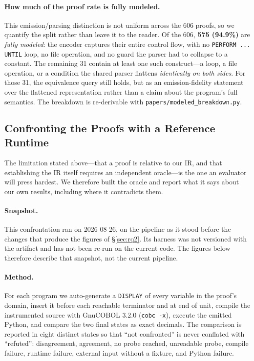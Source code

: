 \documentclass[sigconf,nonacm]{acmart}
\begin{document}
\paragraph{How much of the proof rate is fully modeled.} This emission/parsing distinction is not uniform across the 606 proofs, so we quantify the split rather than leave it to the reader. Of the 606, \textbf{575 (94.9\%)} are \emph{fully modeled}: the encoder captures their entire control flow, with no \texttt{PERFORM ... UNTIL} loop, no file operation, and no guard the parser had to collapse to a constant. The remaining 31 contain at least one such construct---a loop, a file operation, or a condition the shared parser flattens \emph{identically on both sides}. For those 31, the equivalence query still holds, but as an emission-fidelity statement over the flattened representation rather than a claim about the program's full semantics. The breakdown is re-derivable with \texttt{papers/modeled\_breakdown.py}.

\subsection{Confronting the Proofs with a Reference Runtime}\label{sec:oracle}

The limitation stated above---that a proof is relative to our IR, and that establishing the IR itself requires an independent oracle---is the one an evaluator will press hardest. We therefore built the oracle and report what it says about our own results, including where it contradicts them.

\paragraph{Snapshot.} This confrontation ran on 2026-08-26, on the pipeline as it stood before the changes that produce the figures of \S\ref{sec:rq2}. Its harness was not versioned with the artifact and has not been re-run on the current code. The figures below therefore describe that snapshot, not the current pipeline.

\paragraph{Method.} For each program we auto-generate a \texttt{DISPLAY} of every variable in the proof's domain, insert it before each reachable terminator and at end of unit, compile the instrumented source with GnuCOBOL 3.2.0 (\texttt{cobc -x}), execute the emitted Python, and compare the two final states as exact decimals. The comparison is reported in eight distinct states so that ``not confronted'' is never conflated with ``refuted'': disagreement, agreement, no probe reached, unreadable probe, compile failure, runtime failure, external input without a fixture, and Python failure.
\end{document}
